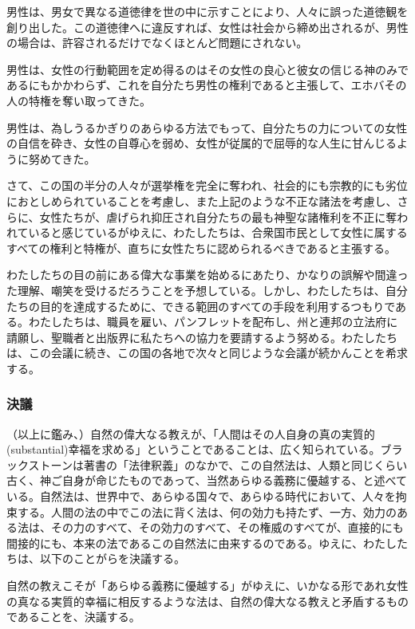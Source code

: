 \documentclass[dvipdfmx,uplatex]{jsarticle}
\begin{document}
男性は、男女で異なる道徳律を世の中に示すことにより、人々に誤った道徳観を創り出した。この道徳律へに違反すれば、女性は社会から締め出されるが、男性の場合は、許容されるだけでなくほとんど問題にされない。

男性は、女性の行動範囲を定め得るのはその女性の良心と彼女の信じる神のみであるにもかかわらず、これを自分たち男性の権利であると主張して、エホバその人の特権を奪い取ってきた。

男性は、為しうるかぎりのあらゆる方法でもって、自分たちの力についての女性の自信を砕き、女性の自尊心を弱め、女性が従属的で屈辱的な人生に甘んじるように努めてきた。
  

さて、この国の半分の人々が選挙権を完全に奪われ、社会的にも宗教的にも劣位におとしめられていることを考慮し、また上記のような不正な諸法を考慮し、さらに、女性たちが、虐げられ抑圧され自分たちの最も神聖な諸権利を不正に奪われていると感じているがゆえに、わたしたちは、合衆国市民として女性に属するすべての権利と特権が、直ちに女性たちに認められるべきであると主張する。
  
わたしたちの目の前にある偉大な事業を始めるにあたり、かなりの誤解や間違った理解、嘲笑を受けるだろうことを予想している。しかし、わたしたちは、自分たちの目的を達成するために、できる範囲のすべての手段を利用するつもりである。わたしたちは、職員を雇い、パンフレットを配布し、州と連邦の立法府に請願し、聖職者と出版界に私たちへの協力を要請するよう努める。わたしたちは、この会議に続き、この国の各地で次々と同じような会議が続かんことを希求する。


\subsubsection*{決議}





（以上に鑑み、）自然の偉大なる教えが、「人間はその人自身の真の実質的(substantial)幸福を求める」ということであることは、広く知られている。ブラックストーンは著書の「法律釈義」のなかで、この自然法は、人類と同じくらい古く、神ご自身が命じたものであって、当然あらゆる義務に優越する、と述べている。自然法は、世界中で、あらゆる国々で、あらゆる時代において、人々を拘束する。人間の法の中でこの法に背く法は、何の効力も持たず、一方、効力のある法は、その力のすべて、その効力のすべて、その権威のすべてが、直接的にも間接的にも、本来の法であるこの自然法に由来するのである。ゆえに、わたしたちは、以下のことがらを決議する。
  
自然の教えこそが「あらゆる義務に優越する」がゆえに、いかなる形であれ女性の真なる実質的幸福に相反するような法は、自然の偉大なる教えと矛盾するものであることを、決議する。
\end{document}
